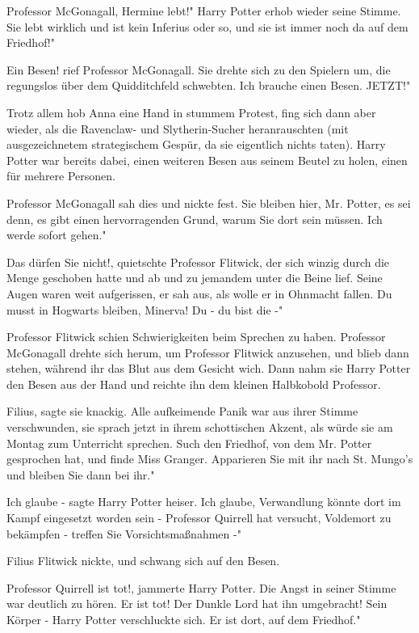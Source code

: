 \glqq Professor McGonagall, Hermine lebt!" Harry Potter erhob wieder seine
Stimme. \glqq Sie lebt wirklich und ist kein Inferius oder so, und sie ist immer
noch da auf dem Friedhof!"

\glqq Ein Besen!\grqq{} rief Professor McGonagall. Sie drehte sich zu den
Spielern um, die regungslos über dem Quidditchfeld schwebten. \glqq Ich brauche
einen Besen. JETZT!"

Trotz allem hob Anna eine Hand in stummem Protest, fing sich dann aber wieder,
als die Ravenclaw- und Slytherin-Sucher heranrauschten (mit ausgezeichnetem
strategischem Gespür, da sie eigentlich nichts taten). Harry Potter war bereits
dabei, einen weiteren Besen aus seinem Beutel zu holen, einen für mehrere
Personen.

Professor McGonagall sah dies und nickte fest. \glqq Sie bleiben hier, Mr.
Potter, es sei denn, es gibt einen hervorragenden Grund, warum Sie dort sein
müssen. Ich werde sofort gehen."

\glqq Das dürfen Sie nicht!\grqq{}, quietschte Professor Flitwick, der sich
winzig durch die Menge geschoben hatte und ab und zu jemandem unter die Beine
lief. Seine Augen waren weit aufgerissen, er sah aus, als wolle er in Ohnmacht
fallen. \glqq Du musst in Hogwarts bleiben, Minerva! Du - du bist die -"

Professor Flitwick schien Schwierigkeiten beim Sprechen zu haben. Professor
McGonagall drehte sich herum, um Professor Flitwick anzusehen, und blieb dann
stehen, während ihr das Blut aus dem Gesicht wich. Dann nahm sie Harry Potter
den Besen aus der Hand und reichte ihn dem kleinen Halbkobold Professor.

\glqq Filius\grqq{}, sagte sie knackig. Alle aufkeimende Panik war aus ihrer
Stimme verschwunden, sie sprach jetzt in ihrem schottischen Akzent, als würde
sie am Montag zum Unterricht sprechen. \glqq Such den Friedhof, von dem Mr.
Potter gesprochen hat, und finde Miss Granger. Apparieren Sie mit ihr nach St.
Mungo's und bleiben Sie dann bei ihr."

\glqq Ich glaube -\grqq{} sagte Harry Potter heiser. \glqq Ich glaube,
Verwandlung könnte dort im Kampf eingesetzt worden sein - Professor Quirrell hat
versucht, Voldemort zu bekämpfen - treffen Sie Vorsichtsmaßnahmen -"

Filius Flitwick nickte, und schwang sich auf den Besen.

\glqq Professor Quirrell ist tot!\grqq{}, jammerte Harry Potter. Die Angst in
seiner Stimme war deutlich zu hören. \glqq Er ist tot! Der Dunkle Lord hat ihn
umgebracht! Sein Körper -\grqq{} Harry Potter verschluckte sich. \glqq Er ist
dort, auf dem Friedhof."

